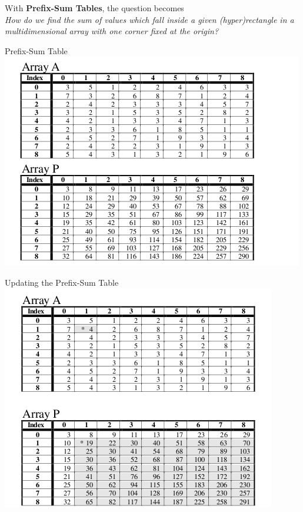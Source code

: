 \documentclass{beamer}
\theoremstyle{definition}
\theoremstyle{definition}
\begin{document}
\begin{frame}
    With \textbf{Prefix-Sum Tables}, the question becomes \\
    \textit{How do we find the sum of values which fall inside a given (hyper)rectangle in a multidimensional array {\color{blue} with one corner fixed at the origin}?}
\end{frame}

\begin{frame}{Prefix-Sum Table}
\includegraphics[scale=0.5]{prefixtable.png}
\cite{Geffner99}
\end{frame}

\begin{frame}{Updating the Prefix-Sum Table}
\includegraphics[scale=0.5]{prefixupdate.png}
\cite{Geffner99}
\end{frame}
\end{document}
